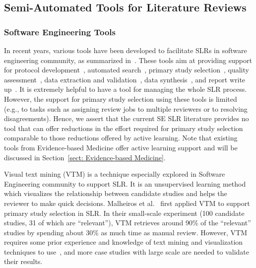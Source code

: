 \documentclass{svjour3}
\theoremstyle{break}
\begin{document}
\subsection{Semi-Automated Tools for Literature  Reviews}

\subsubsection{Software Engineering Tools}

In recent years, various tools have been developed to facilitate SLRs in software engineering community, as summarized in~\cite{marshall2015tools,marshall2014tools,marshall2013tools}. These tools aim at providing support for protocol development~\cite{Molleri:2015:SWA:2745802.2745825,fernandez2010slr,hernandes2012using}, automated search~\cite{Molleri:2015:SWA:2745802.2745825,hernandes2012using}, primary study selection~\cite{Molleri:2015:SWA:2745802.2745825,hernandes2012using,fernandez2010slr,bowes2012slurp}, quality assessment~\cite{fernandez2010slr,bowes2012slurp,Molleri:2015:SWA:2745802.2745825}, data extraction and validation~\cite{Molleri:2015:SWA:2745802.2745825,hernandes2012using,fernandez2010slr,bowes2012slurp}, data synthesis~\cite{Molleri:2015:SWA:2745802.2745825,hernandes2012using,fernandez2010slr,bowes2012slurp},
and report write up~\cite{Molleri:2015:SWA:2745802.2745825,hernandes2012using,fernandez2010slr,bowes2012slurp}. It is extremely helpful to have a tool for managing the whole SLR process. However, the support for primary study selection using these tools is limited (e.g., to tasks such as assigning review jobs to multiple reviewers or to resolving disagreements).
Hence, we assert that the current SE SLR literature provides
no tool that can offer reductions in the effort required for primary study selection comparable to those reductions offered by active learning. Note that existing tools from Evidence-based Medicine offer active learning support and will be discussed in Section~\ref{sect: Evidence-based Medicine}.

Visual text mining (VTM) is a technique especially explored in Software Engineering community to support SLR. It is an unsupervised learning method which visualizes the relationship between candidate studies and helps the reviewer to make quick decisions. Malheiros et al.~\cite{malheiros2007visual} first applied VTM to support primary study selection in SLR. In their small-scale experiment (100 candidate studies, 31 of which are ``relevant''), VTM retrieves around 90\% of the ``relevant'' studies by spending about 30\% as much time as manual review. However, VTM requires some prior experience and knowledge of text mining and visualization techniques to use~\cite{bowes2012slurp}, and more case studies with large scale are needed to validate their results. 
\end{document}
